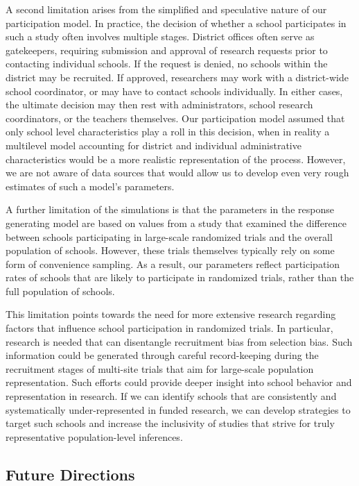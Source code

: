 \documentclass[
  english,
  man,floatsintext]{apa6}
\begin{document}
A second limitation arises from the simplified and speculative nature of our participation model. In practice, the decision of whether a school participates in such a study often involves multiple stages. District offices often serve as gatekeepers, requiring submission and approval of research requests prior to contacting individual schools. If the request is denied, no schools within the district may be recruited. If approved, researchers may work with a district-wide school coordinator, or may have to contact schools individually. In either cases, the ultimate decision may then rest with administrators, school research coordinators, or the teachers themselves. Our participation model assumed that only school level characteristics play a roll in this decision, when in reality a multilevel model accounting for district and individual administrative characteristics would be a more realistic representation of the process. However, we are not aware of data sources that would allow us to develop even very rough estimates of such a model's parameters.

A further limitation of the simulations is that the parameters in the response generating model are based on values from a study that examined the difference between schools participating in large-scale randomized trials and the overall population of schools. However, these trials themselves typically rely on some form of convenience sampling. As a result, our parameters reflect participation rates of schools that are likely to participate in randomized trials, rather than the full population of schools.

This limitation points towards the need for more extensive research regarding factors that influence school participation in randomized trials. In particular, research is needed that can disentangle recruitment bias from selection bias. Such information could be generated through careful record-keeping during the recruitment stages of multi-site trials that aim for large-scale population representation.
Such efforts could provide deeper insight into school behavior and representation in research. If we can identify schools that are consistently and systematically under-represented in funded research, we can develop strategies to target such schools and increase the inclusivity of studies that strive for truly representative population-level inferences.

\hypertarget{future-directions}{%
\subsection*{Future Directions}\label{future-directions}}
\end{document}
